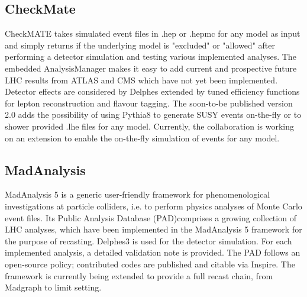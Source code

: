 \documentclass[11pt]{cernrep}
\begin{document}
\subsection{CheckMate}
CheckMATE takes simulated event files in .hep or .hepmc for any model as input and simply returns if the underlying model is "excluded" or "allowed" after performing a detector simulation and testing various implemented analyses. The embedded AnalysisManager makes it easy to add current and prospective future LHC results from ATLAS and CMS which have not yet been implemented. Detector effects are considered by Delphes extended by tuned efficiency functions for lepton reconstruction and flavour tagging. The soon-to-be published version 2.0 adds the possibility of using Pythia8 to generate SUSY events on-the-fly or to shower provided .lhe files for any model. Currently, the collaboration is working on an extension to enable the on-the-fly simulation of events for any model.


\subsection{MadAnalysis}
MadAnalysis 5 is a generic user-friendly framework for phenomenological investigations at particle colliders, i.e. to perform physics analyses of Monte Carlo event files. Its Public Analysis Database (PAD)comprises a growing collection of LHC analyses, which have been implemented in the MadAnalysis 5 framework for the purpose of recasting. Delphes3 is used for the detector simulation. For each implemented analysis, a detailed validation note is provided. The PAD follows an open-source policy; contributed codes are published and citable via Inspire. The framework is currently being extended to provide a full recast chain, from Madgraph to limit setting.
\end{document}
